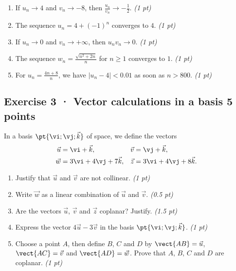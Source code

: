 \begin{enumerate}

\item If $u_n\to 4$ and $v_n\to-8$, then $\frac{u_n}{v_n}\to-\frac{1}{2}$. \hfill\textit{(1 pt)}

\item The sequence $u_n=4+(-1)^n$ converges to $4$. \hfill\textit{(1 pt)}

\item If $u_n\to0$ and $v_n\to+\infty$, then $u_nv_n\to0$. \hfill\textit{(1 pt)}

\item The sequence $w_n=\frac{\sqrt{n^2+2n}}{n}$ for $n\ge1$ converges to $1$. \hfill\textit{(1 pt)}

\item For $u_n=\frac{4n+8}{n}$, we have $|u_n-4|<\num{0,01}$ as soon as $n> 800$. \hfill\textit{(1 pt)}

\end{enumerate}

\mxnewpage{}

\subsection*{Exercise 3 · Vector calculations in a basis \hfill 5 points}In a basis $\pt{\vi;\vj;\vec k}$ of space, we define the vectors
\[\begin{aligned}\vec u&=\vi+\vec k,&\vec v&=\vj+\vec k,\\
\vec w&=3\vi+4\vj+7\vec k,&\vec z&=3\vi+4\vj+8\vec k.\end{aligned}\]

\begin{enumerate}

\item Justify that $\vec u$ and $\vec v$ are not collinear. \hfill\textit{(1 pt)}

\item Write $\vec w$ as a linear combination of $\vec u$ and $\vec v$. \hfill\textit{(0.5 pt)}

\item Are the vectors $\vec u$, $\vec v$ and $\vec z$ coplanar? Justify. \hfill\textit{(1.5 pt)}

\item Express the vector $4\vec u-3\vec v$ in the basis $\pt{\vi;\vj;\vec k}$. \hfill\textit{(1 pt)}

\item Choose a point $A$, then define $B$, $C$ and $D$ by $\vect{AB}=\vec u$, $\vect{AC}=\vec v$ and $\vect{AD}=\vec w$. Prove that $A$, $B$, $C$ and $D$ are coplanar. \hfill\textit{(1 pt)}

\end{enumerate}


